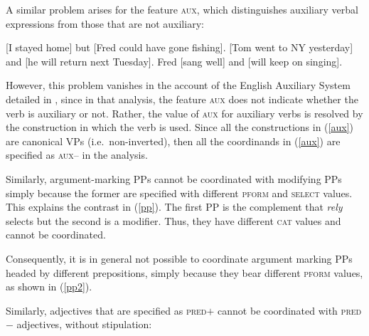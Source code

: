 \noindent
A similar problem arises for the feature \textsc{aux}, which distinguishes auxiliary verbal expressions from those that
are not auxiliary:

\eal
\label{aux}
\ex {}[I stayed home]\sub{\aux $-$} but [Fred could have gone fishing]\sub{\aux $+$}.
\ex {}[Tom went to NY yesterday]\sub{\aux $-$} and [he will return next Tuesday]\sub{\aux $+$}.
\ex Fred [sang well]\sub{\aux $-$} and [will keep on singing]\sub{\aux $+$}.
\zl

\noindent
However, this problem vanishes in the account of the English Auxiliary System detailed in \citet{SagEtAl20}, since in that analysis,
the feature \textsc{aux} does not indicate whether the verb is auxiliary or not. Rather, the value of \textsc{aux} for auxiliary verbs is resolved by the construction in which the verb is used. Since all the constructions in (\ref{aux}) are canonical VPs (i.e.\ non-inverted), then 
all the coordinands in (\ref{aux}) are specified as \textsc{aux--} in
the \citet{SagEtAl20} analysis.




Similarly, argument-marking PPs cannot be coordinated with modifying PPs simply because the former are specified with different  \textsc{pform} and \textsc{select} values. This explains the contrast
in (\ref{pp}). The first PP is the complement that \emph{rely}
selects but the second is a modifier. Thus, they have different \textsc{cat} values 
and cannot be coordinated.


\eal
\label{pp}
\zl

\noindent
Consequently, it is in general not possible to coordinate argument marking PPs headed by different prepositions, simply because they bear
different \textsc{pform} values, as shown in (\ref{pp2}).

\eal
\label{pp2}

\zl

Similarly, adjectives that are specified as \textsc{pred}$+$ cannot be
coordinated with  \textsc{pred}$-$ adjectives, without stipulation:

\eal
{}
\zl


